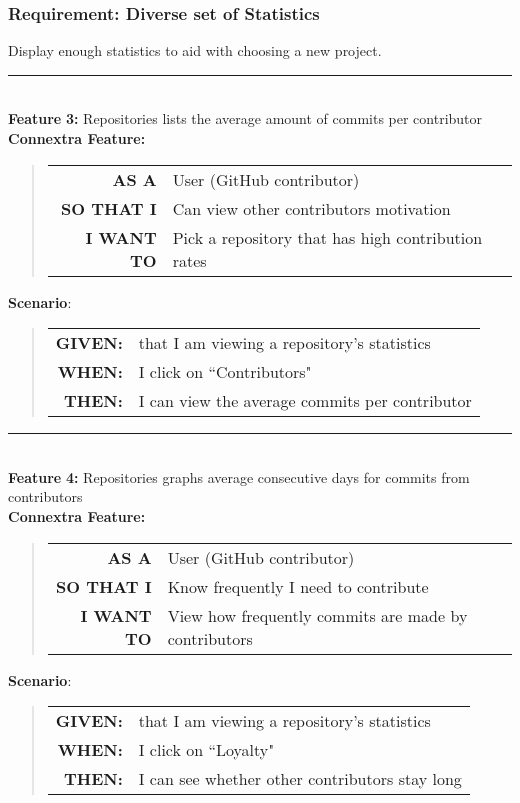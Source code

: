 \documentclass[12pt]{article}
\newcommand{\Feature}[1]{ 
   \noindent \textbf{Feature} #1
}
\newcommand{\CFeature}[4]{
\noindent \textbf{Connextra Feature:}
	\begin{quote}
	\begin{tabular}{rl}
	\textbf{AS A} & #1\\
	\textbf{SO THAT \uppercase{#2}} & #3\\
	\textbf{\uppercase{#2} WANT TO} & #4  
	\end{tabular}
	\end{quote}
}
\newcommand{\GivenSc} {
	\noindent \textbf{GIVEN:}
	}
\newcommand{\WhenSc} {
	\noindent \textbf{WHEN:}
	}
\newcommand{\AndSc} {
	\noindent \textbf{AND:}
	}
\newcommand{\ThenSc} {
	\noindent \textbf{THEN:}
	}
\begin{document}
\begin{framed}
\subsubsection{Requirement: Diverse set of Statistics}
Display enough statistics to aid with choosing a new project.\\[0.2cm]

\hrule~\\

\noindent\Feature{\textbf{3:} Repositories lists the average amount of commits per contributor}\\[0.2cm]

\CFeature{User (\textsf{GitHub} contributor)}{I}{Can view other contributors motivation}{Pick a repository that has high contribution rates}

\noindent \textbf{Scenario}:
\begin{quote}
\begin{tabular}{rl}
\GivenSc & that I am viewing a repository's statistics\\
\WhenSc & I click on ``Contributors"\\
\ThenSc & I can view the average commits per contributor
\end{tabular}
\end{quote}

\hrule~\\

\Feature{\textbf{4:} Repositories graphs average consecutive days for commits from contributors}\\[0.4cm]

\CFeature{User (\textsf{GitHub} contributor)}{I}{Know frequently I need to contribute}{View how frequently commits are made by contributors}

\noindent \textbf{Scenario}:
\begin{quote}
\begin{tabular}{rl}
\GivenSc & that I am viewing a repository's statistics\\
\WhenSc & I click on ``Loyalty"\\
\ThenSc & I can see whether other contributors stay long
\end{tabular}
\end{quote}
\end{framed}
\end{document}
